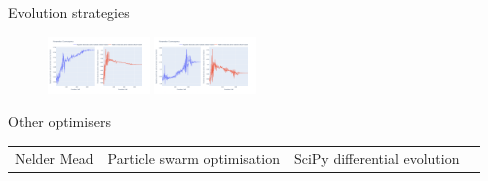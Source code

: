 \documentclass[aspectratio=169]{beamer}
\begin{document}
\begin{frame}{Evolution strategies}
\begin{figure}
        \includegraphics[width=0.24\textwidth]{Images/Optimisers/xnes_params.png}
        \includegraphics[width=0.24\textwidth]{Images/Optimisers/cmaes_params.png}
        \label{fig:optimisers4}
    \end{figure}
\end{frame}

\begin{frame}{Other optimisers}
    \vspace{-6mm}
    \begin{table}[]
        \centering
        \footnotesize
    \begin{tabularx}{\textwidth}{*{4}{Y}}
         Nelder Mead &
         Particle swarm optimisation &
         SciPy differential evolution
    \end{tabularx}
    \end{table}


\end{frame}
\end{document}
